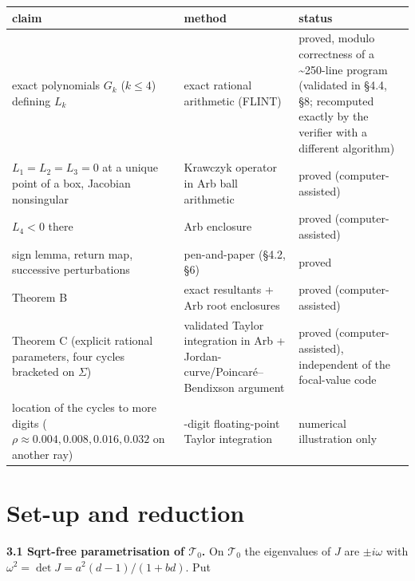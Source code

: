 \documentclass[11pt,a4paper]{report}
\begin{document}
{\def\LTcaptype{none} %
\begin{longtable}[]{@{}
  >{\raggedright\arraybackslash}p{}
  >{\raggedright\arraybackslash}p{}
  >{\raggedright\arraybackslash}p{}@{}}
\toprule\noalign{}
\begin{minipage}[b]{\linewidth}\raggedright
claim
\end{minipage} & \begin{minipage}[b]{\linewidth}\raggedright
method
\end{minipage} & \begin{minipage}[b]{\linewidth}\raggedright
status
\end{minipage} \\
\midrule\noalign{}
\endhead
\bottomrule\noalign{}
\endlastfoot
exact polynomials \(G_k\) (\(k\le4\)) defining \(L_k\) & exact rational arithmetic (FLINT) & proved, modulo correctness of a \textasciitilde250-line program (validated in §4.4, §8; recomputed exactly by the verifier with a different algorithm) \\
\(L_1=L_2=L_3=0\) at a unique point of a box, Jacobian nonsingular & Krawczyk operator in Arb ball arithmetic & proved (computer-assisted) \\
\(L_4<0\) there & Arb enclosure & proved (computer-assisted) \\
sign lemma, return map, successive perturbations & pen-and-paper (§4.2, §6) & proved \\
Theorem B & exact resultants + Arb root enclosures & proved (computer-assisted) \\
Theorem C (explicit rational parameters, four cycles bracketed on \(\Sigma\)) & validated Taylor integration in Arb + Jordan-curve/Poincaré--Bendixson argument & proved (computer-assisted), independent of the focal-value code \\
location of the cycles to more digits (\(\rho\approx0.004,0.008,0.016,0.032\) on another ray) & 60-digit floating-point Taylor integration & numerical illustration only \\
\end{longtable}
}

\section{Set-up and reduction}

\textbf{3.1 Sqrt-free parametrisation of \(\mathcal T_0\).} On \(\mathcal T_0\) the eigenvalues of \(J\) are
\(\pm i\omega\) with \(\omega^2=\det J=a^2(d-1)/(1+bd)\). Put
\end{document}
